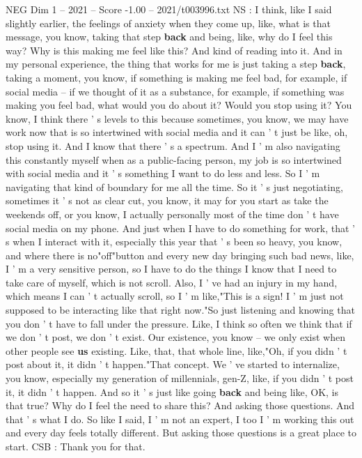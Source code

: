 \begin{textsample}{NEG Dim 1 – 2021 – Score -1.00 – 2021/t003996.txt}
NS : I think, like I said slightly earlier, the feelings of anxiety when they come up, like, what is that message, you know, taking that step \textbf{back} and being, like, why do I feel this way?
Why is this making me feel like this?
And kind of reading into it.
And in my personal experience, the thing that works for me is just taking a step \textbf{back}, taking a moment, you know, if something is making me feel bad, for example, if social media -- if we thought of it as a substance, for example, if something was making you feel bad, what would you do about it?
Would you stop using it?
You know, I think there ' s levels to this because sometimes, you know, we may have work now that is so intertwined with social media and it can ' t just be like, oh, stop using it.
And I know that there ' s a spectrum.
And I ' m also navigating this constantly myself when as a public-facing person, my job is so intertwined with social media and it ' s something I want to do less and less.
So I ' m navigating that kind of boundary for me all the time.
So it ' s just negotiating, sometimes it ' s not as clear cut, you know, it may for you start as take the weekends off, or you know, I actually personally most of the time don ' t have social media on my phone.
And just when I have to do something for work, that ' s when I interact with it, especially this year that ' s been so heavy, you know, and where there is no"off"button and every new day bringing such bad news, like, I ' m a very sensitive person, so I have to do the things I know that I need to take care of myself, which is not scroll.
Also, I ' ve had an injury in my hand, which means I can ' t actually scroll, so I ' m like,"This is a sign!
I ' m just not supposed to be interacting like that right now."So just listening and knowing that you don ' t have to fall under the pressure.
Like, I think so often we think that if we don ' t post, we don ' t exist.
Our existence, you know -- we only exist when other people see \textbf{us} existing.
Like, that, that whole line, like,"Oh, if you didn ' t post about it, it didn ' t happen."That concept.
We ' ve started to internalize, you know, especially my generation of millennials, gen-Z, like, if you didn ' t post it, it didn ' t happen.
And so it ' s just like going \textbf{back} and being like, OK, is that true?
Why do I feel the need to share this?
And asking those questions.
And that ' s what I do.
So like I said, I ' m not an expert, I too I ' m working this out and every day feels totally different.
But asking those questions is a great place to start.
CSB : Thank you for that.

\end{textsample}
